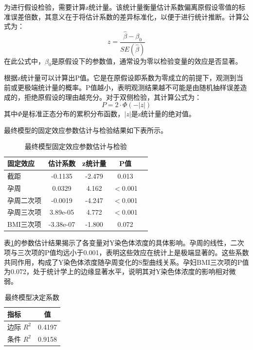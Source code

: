 为进行假设检验，需要计算z统计量。该统计量衡量估计系数偏离原假设零值的标准误差倍数，其意义在于将估计系数的差异标准化，以便于进行统计推断。计算公式为：
\begin{equation}
z = \frac{\hat{\beta} - \beta_0}{SE(\hat{\beta})}
\end{equation}
在此公式中，$\beta_0$是原假设下的参数值，通常设为零以检验变量的效应是否显著。

根据z统计量可以计算出P值。它是在原假设即系数为零成立的前提下，观测到当前或更极端统计量的概率。P值越小，表明观测结果越不可能是由随机抽样误差造成的，拒绝原假设的理由越充分。对于双侧检验，其计算公式为：
\begin{equation}
P = 2 \cdot \Phi(-|z|)
\end{equation}
其中$\Phi$是标准正态分布的累积分布函数，$|z|$是z统计量的绝对值。

最终模型的固定效应参数估计与检验结果如下表所示。

\begin{table}[h!]
\centering
\caption{最终模型固定效应参数估计与检验}
\label{tab:fixed_effects_final}
\begin{tabular}{lcccc}
\toprule
固定效应 & 估计系数 & z统计量 & P值 \\
\midrule
截距 & -0.1135 & -2.479 & 0.013 \\
孕周 & 0.0329 & 4.162 & $<$0.001 \\
孕周二次项 & -0.0019 & -4.247 & $<$0.001 \\
孕周三次项 & 3.89e-05 & 4.772 & $<$0.001 \\
BMI三次项 & -3.38e-07 & -1.800 & 0.072 \\
\bottomrule
\end{tabular}
\end{table}

表\ref{tab:fixed_effects_final}的参数估计结果揭示了各变量对Y染色体浓度的具体影响。孕周的线性，二次项与三次项的P值均远小于0.001，表明这些效应在统计上是极端显著的。这些系数共同作用，构成了Y染色体浓度随孕周变化的S型曲线关系。孕妇BMI三次项的P值为0.072，处于统计学上的边缘显著水平，说明其对Y染色体浓度的影响相对微弱。

\begin{table}[h!]
\centering
\caption{最终模型决定系数}
\label{tab:r_squared_final}
\begin{tabular}{lc}
\toprule
指标 & 值 \\
\midrule
边际 $R^2$ & 0.4197 \\
条件 $R^2$ & 0.9158 \\
\bottomrule
\end{tabular}
\end{table}

